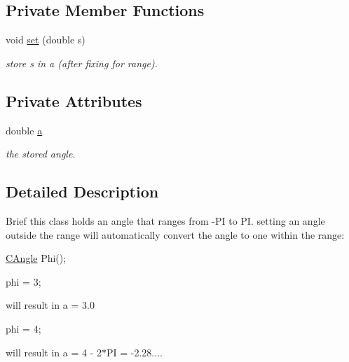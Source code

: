 \subsection*{Private Member Functions}
\begin{DoxyCompactItemize}
\item 
\hypertarget{class_c_angle_ae9806ae61145fe6955ebb26c0799cb9e}{
void \hyperlink{class_c_angle_ae9806ae61145fe6955ebb26c0799cb9e}{set} (double s)}
\label{class_c_angle_ae9806ae61145fe6955ebb26c0799cb9e}

\begin{DoxyCompactList}\small\item\em store s in a (after fixing for range). \item\end{DoxyCompactList}\end{DoxyCompactItemize}
\subsection*{Private Attributes}
\begin{DoxyCompactItemize}
\item 
\hypertarget{class_c_angle_aa585e30115aa2ec75186b7dcfe089a93}{
double \hyperlink{class_c_angle_aa585e30115aa2ec75186b7dcfe089a93}{a}}
\label{class_c_angle_aa585e30115aa2ec75186b7dcfe089a93}

\begin{DoxyCompactList}\small\item\em the stored angle. \item\end{DoxyCompactList}\end{DoxyCompactItemize}


\subsection{Detailed Description}
Brief this class holds an angle that ranges from -\/PI to PI. setting an angle outside the range will automatically convert the angle to one within the range:\par
 \hyperlink{class_c_angle}{CAngle} Phi();\par
 phi = 3; \par
will result in a = 3.0\par
\par
 phi = 4; \par
will result in a = 4 -\/ 2$\ast$PI = -\/2.28.... 


